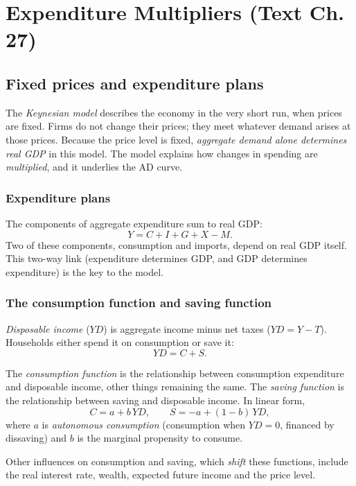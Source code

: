 \chapter{Expenditure Multipliers (Text Ch. 27)}

\section{Fixed prices and expenditure plans}

The \emph{Keynesian model} describes the economy in the very short run, when prices are
fixed. Firms do not change their prices; they meet whatever demand arises at those prices.
Because the price level is fixed, \emph{aggregate demand alone determines real GDP} in this
model. The model explains how changes in spending are \emph{multiplied}, and it underlies
the AD curve.

\subsection{Expenditure plans}

The components of aggregate expenditure sum to real GDP:
\[
  Y = C + I + G + X - M.
\]
Two of these components, consumption and imports, depend on real GDP itself. This
two-way link (expenditure determines GDP, and GDP determines expenditure) is the key to
the model.

\subsection{The consumption function and saving function}

\emph{Disposable income} ($YD$) is aggregate income minus net taxes ($YD = Y - T$).
Households either spend it on consumption or save it:
\[
  YD = C + S.
\]

\begin{definition}
The \emph{consumption function} is the relationship between consumption expenditure and
disposable income, other things remaining the same. The \emph{saving function} is the
relationship between saving and disposable income. In linear form,
\[
  C = a + b\,YD, \qquad S = -a + (1 - b)\,YD,
\]
where $a$ is \emph{autonomous consumption} (consumption when $YD = 0$, financed by
dissaving) and $b$ is the marginal propensity to consume.
\end{definition}

Other influences on consumption and saving, which \emph{shift} these functions, include
the real interest rate, wealth, expected future income and the price level.

